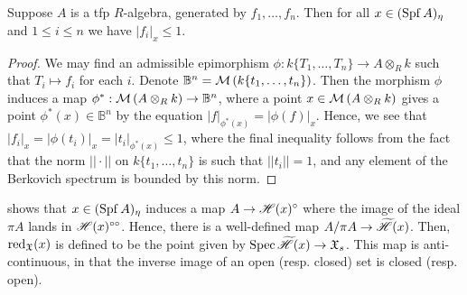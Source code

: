 \begin{lemma}\label{lemma:ringfactors} \parencite[Exercise 5.2.2.6]{temk}
    Suppose $A$ is a tfp $R$-algebra, generated by $f_1, \dots, f_n$.
    Then for all $x \in (\operatorname{Spf} A)_{\eta}$ and $1 \leq i \leq n$ we have $|f_i|_x \leq 1$.
\end{lemma}
\begin{proof}
    We may find an admissible epimorphism $\phi: k\{T_1, \dots, T_n\} \to A \otimes_{R} k$ such that $T_i \mapsto f_i$ for each $i$.
    Denote $\mathbb{B}^{n} = \mathcal{M}\left(k\{t_1, \dots, t_n\}\right)$.
    Then the morphism $\phi$ induces a map $\phi^{*}: \mathcal{M}\left(A \otimes_{R} k\right) \to \mathbb{B}^n$, where a point $x \in \mathcal{M}\left(A \otimes_{R} k\right)$ gives a point $\phi^{*}(x) \in \mathbb{B}^n$ by the equation $|f|_{\phi^{*}(x)} = |\phi(f)|_x$.
    Hence, we see that $|f_i|_x = |\phi(t_i)|_x = |t_i|_{\phi^{*}(x)} \leq 1$, where the final inequality follows from the fact that the norm $||\cdot||$ on $k\{t_1, \dots, t_n\}$ is such that $||t_i|| = 1$, and any element of the Berkovich spectrum is bounded by this norm.
\end{proof}

 shows that $x \in (\operatorname{Spf} A)_{\eta}$ induces a map $A \to \mathscr{H}(x)^{\circ}$ where the image of the ideal $\pi A$ lands in $\mathscr{H}(x)^{\circ \circ}$.
Hence, there is a well-defined map $A/\pi A \to \widetilde{\mathscr{H}}(x)$.
Then, $\operatorname{red}_{\mathfrak{X}}(x)$ is defined to be the point given by $\operatorname{Spec} \widetilde{\mathscr{H}}(x) \to \mathfrak{X}_s$.
This map is anti-continuous, in that the inverse image of an open (resp. closed) set is closed (resp. open).

